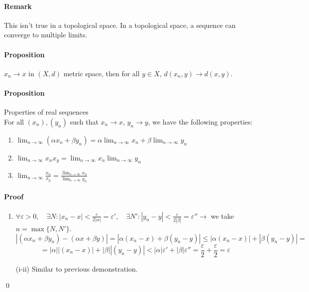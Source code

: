 \documentclass{article}
\newcommand{\abs}[1]{\left|#1\right|}
\newcommand{\limn}{\lim_{n \to \infty}}
\newcommand{\Ep}{\varepsilon}
\newcommand{\Proposition}{\paragraph{Proposition}}
\newcommand{\Remark}{\paragraph{Remark}}
\newcommand{\Proof}{\paragraph{Proof}}
\begin{document}
  \Remark This isn't true in a topological space. In a topological space, a
  sequence can converge to multiple limits.

  \Proposition $x_n \to x$ in $(X,d)$ metric space, then for all $y \in X$,
  $d(x_n,y) \to d(x,y)$.


  \Proposition Properties of real sequences
  \\For all $(x_n), (y_n)$ such that $x_n \to x$, $y_n \to y$, we have the
    following properties:
    \begin{enumerate}[label=(\roman*)]
      \item $ \displaystyle
      \limn (\alpha x_n + \beta y_n) = \alpha \limn x_n + \beta \limn y_n $

      \item $ \displaystyle
      \limn x_n x_y = \limn x_n \limn y_n $

      \item $ \displaystyle
      \limn \frac{x_n}{x_y} = \frac{\limn x_n}{\limn y_n} $
    \end{enumerate}

  \Proof
    \begin{enumerate}[label=(\roman*)]
      \item $ \displaystyle
      \forall \Ep > 0, \quad
      \exists N : \abs{x_n - x} < \frac{\Ep}{2\abs{\alpha}} = \Ep', \quad
      \exists N' : \abs{y_n - y} < \frac{\Ep}{2\abs{\beta}} = \Ep''
      \rightarrow $ we take $ n = \max \{ N, N'\} $.
      \begin{equation*}
        \abs{(\alpha x_n + \beta y_n) - (\alpha x + \beta y)} =
        \abs{\alpha (x_n - x) + \beta (y_n - y)} \leq
        \abs{\alpha (x_n - x)} + \abs{\beta (y_n - y)} =
      \end{equation*}
      \begin{equation*} =
        \abs{\alpha} \abs{(x_n - x)} + \abs{\beta} \abs{(y_n - y)} <
        \abs{\alpha} \Ep' + \abs{\beta} \Ep'' =
        \frac{\Ep}{2} + \frac{\Ep}{2} =
        \Ep
      \end{equation*}

      \item[(i-ii)] Similar to previous demonstration.
    \end{enumerate}
    \qed
\end{document}
